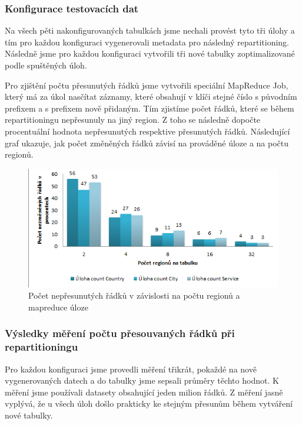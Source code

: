 \documentclass[thesis=M,czech]{FITthesis}[2012/06/26]
\begin{document}
\subsubsection{Konfigurace testovacích dat}
Na všech pěti nakonfigurovaných tabulkách jsme nechali provést tyto tři úlohy a tím pro každou konfiguraci vygenerovali metadata pro následný repartitioning.  Následně jsme pro každou konfiguraci vytvořili tři nové tabulky zoptimalizované podle spuštěných úloh. 


Pro zjištění počtu přesunutých řádků jsme vytvořili speciální MapReduce Job, který má za úkol nasčítat záznamy, které obsahují v klíči stejné číslo s původním prefixem a s prefixem nově přidaným. Tím zjistíme počet řádků, které se během repartitioningu nepřesunuly na jiný region. Z toho se následně dopočte procentuální hodnota nepřesunutých respektive přesunutých řádků. Následující graf ukazuje, jak počet změněných řádků závisí na prováděné úloze a na počtu regionů.

\begin{figure}[h]\centering
	\includegraphics[width=1\textwidth, angle=0]{files/graf-presuny}
	\caption[Počet nepřesunutých řádků v závislosti na počtu regionů a MapReduce úloze]
	{Počet nepřesunutých řádků v závislosti na počtu regionů a mapreduce úloze}\label{fig:eko}
\end{figure}

\subsubsection{Výsledky měření počtu přesouvaných řádků při repartitioningu}
Pro každou konfiguraci jsme provedli měření třikrát, pokaždé na nově vygenerovaných datech a do tabulky jsme sepsali průměry těchto hodnot. K měření jsme používali datasety obsahující jeden milion řádků. Z měření jasně vyplývá, že u všech úloh došlo prakticky ke stejným přesunům během vytváření nové tabulky. 
\end{document}
